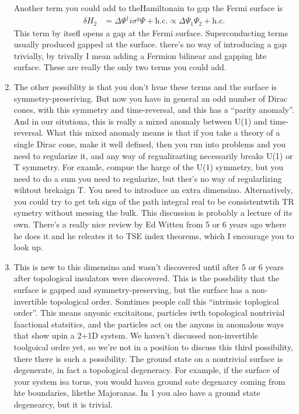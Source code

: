 \begin{enumerate}
        Another term you could add to theHamiltonain to gap the Fermi surface is
        \begin{align}
            \delta H_2 &=
            \Delta \Psi^\dagger i\sigma^y \Psi + \mathrm{h.c.}
            \propto
            \Delta \Psi_1\Psi_2 + \mathrm{h.c.}
        \end{align}
        This term by itsefl opens a gap at the Fermi surface.
        Superconducting terms usually produced gapped at the surface.
        there's no way of introducing a gap trivially,
        by trivally I mean adding a Fermion bilinear and gapping hte surface.
        These are really the only two terms you could add.
    \item The other possiblity is that you don't hvae these terms and the
        surface is symmetry-preseriving.
        But now you have in general an odd number of Dirac cones,
        with this symmetry and time-reversal,
        and this has a ``parity anomaly''.
        And in our situtiona,
        this is really a mixed anomaly between U(1) and time-reversal.
        What this mixed anomaly means is that if you take a theory of a single
        Dirac cone,
        make it well defined,
        then you run into problems and you need to regularize it,
        and any way of regualirazting necessarily breaks U(1) or T symmetry.
        For examle, compue the harge of the U(1) symmetry,
        but you need to do a sum you need to regularize,
        but ther's no way of regularlizing wihtout brekaign T.
        You need to introduce an extra dimensino.
        Alternatively,
        you could try to get teh sign of the path integral real to be
        consistentwtih TR symetry without messing the bulk.
        This discussion is probably a lecture of its own.
        There's a really nice review by Ed Witten from 5 or 6 years ago where he
        does it and he releates it to TSE index theorems,
        which I encourage you to look up.
    \item This is new to this dimensino and wasn't discovered until after 5 or 6
        years after topological insulators were discovered.
        This is the possbility that the surface is gapped and
        symmetry-preserving,
        but the surface has a non-invertible topological order.
        Somtimes people call this ``intrinsic toplogical order''.
        This means anyonic excitaitons,
        particles iwth topological nontrivial faactional statsitics,
        and the particles act on the anyons in anomalous ways that show upin a
        2+1D system.
        We haven't discussed non-invertible toolgoical ordre yet,
        so we're not in a position to discuss this third possibility,
        there there is such a possibility.
        The ground state on a nontrivial surface is degenerate,
        in fact a topological degeneracy.
        For example, if the surface of your system isa torus,
        you would havea ground sate degenarcy coming from hte boundaries,
        likethe Majoranas.
        In 1 you also have a ground state degenearcy,
        but it is trivial.
\end{enumerate}

